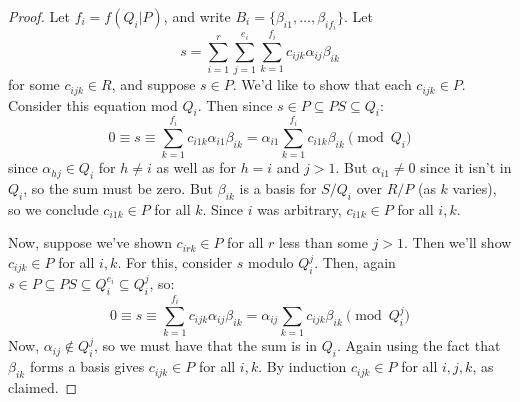\begin{proof}
	Let $f_i = f(Q_i|P)$, and write $B_i = \{ \beta_{i1},\ldots,\beta_{if_i}\}$. Let
	\[ s = \sum_{i=1}^r \sum_{j=1}^{e_i} \sum_{k=1}^{f_i} c_{ijk}\alpha_{ij}\beta_{ik} \]
	for some $c_{ijk} \in R$, and suppose $s \in P$. We'd like to show that each $c_{ijk} \in P$. Consider this equation mod $Q_i$. Then since $s \in P \subseteq PS \subseteq Q_i$:
	\[ 0 \equiv s \equiv \sum_{k=1}^{f_i} c_{i1k}\alpha_{i1}\beta_{ik} = \alpha_{i1}\sum_{k=1}^{f_i} c_{i1k}\beta_{ik} \pmod{Q_i} \]
	since $\alpha_{hj} \in Q_i$ for $h \neq i$ as well as for $h=i$ and $j>1$. But $\alpha_{i1} \neq 0$ since it isn't in $Q_i$, so the sum must be zero. But $\beta_{ik}$ is a basis for $S/Q_i$ over $R/P$ (as $k$ varies), so we conclude $c_{i1k} \in P$ for all $k$. Since $i$ was arbitrary, $c_{i1k} \in P$ for all $i,k$.
	
	Now, suppose we've shown $c_{irk} \in P$ for all $r$ less than some $j > 1$. Then we'll show $c_{ijk} \in P$ for all $i,k$. For this, consider $s$ modulo $Q_i^j$. Then, again $s \in P \subseteq PS \subseteq Q_i^{e_i} \subseteq Q_i^j$, so:
	\[ 0 \equiv s \equiv \sum_{k=1}^{f_i} c_{ijk}\alpha_{ij}\beta_{ik} = \alpha_{ij}\sum_{k=1} c_{ijk}\beta_{ik} \pmod{Q_i^j} \]
	Now, $\alpha_{ij} \notin Q_i^j$, so we must have that the sum is in $Q_i$. Again using the fact that $\beta_{ik}$ forms a basis gives $c_{ijk} \in P$ for all $i,k$. By induction $c_{ijk} \in P$ for all $i,j,k$, as claimed.
\end{proof}
